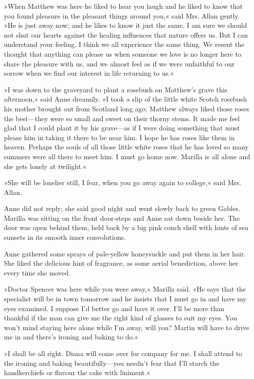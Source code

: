 »When Matthew was here he liked to hear you laugh and he liked to know that you found pleasure in the pleasant things around you,« said Mrs. Allan gently. »He is just away now; and he likes to know it just the same. I am sure we should not shut our hearts against the healing influences that nature offers us. But I can understand your feeling. I think we all experience the same thing. We resent the thought that anything can please us when someone we love is no longer here to share the pleasure with us, and we almost feel as if we were unfaithful to our sorrow when we find our interest in life returning to us.«

»I was down to the graveyard to plant a rosebush on Matthew's grave this afternoon,« said Anne dreamily. »I took a slip of the little white Scotch rosebush his mother brought out from Scotland long ago; Matthew always liked those roses the best—they were so small and sweet on their thorny stems. It made me feel glad that I could plant it by his grave—as if I were doing something that must please him in taking it there to be near him. I hope he has roses like them in heaven. Perhaps the souls of all those little white roses that he has loved so many summers were all there to meet him. I must go home now. Marilla is all alone and she gets lonely at twilight.«

»She will be lonelier still, I fear, when you go away again to college,« said Mrs. Allan.

Anne did not reply; she said good night and went slowly back to green Gables. Marilla was sitting on the front door-steps and Anne sat down beside her. The door was open behind them, held back by a big pink conch shell with hints of sea sunsets in its smooth inner convolutions.

Anne gathered some sprays of pale-yellow honeysuckle and put them in her hair. She liked the delicious hint of fragrance, as some aerial benediction, above her every time she moved.

»Doctor Spencer was here while you were away,« Marilla said. »He says that the specialist will be in town tomorrow and he insists that I must go in and have my eyes examined. I suppose I'd better go and have it over. I'll be more than thankful if the man can give me the right kind of glasses to suit my eyes. You won't mind staying here alone while I'm away, will you? Martin will have to drive me in and there's ironing and baking to do.«

»I shall be all right. Diana will come over for company for me. I shall attend to the ironing and baking beautifully—you needn't fear that I'll starch the handkerchiefs or flavour the cake with liniment.«

